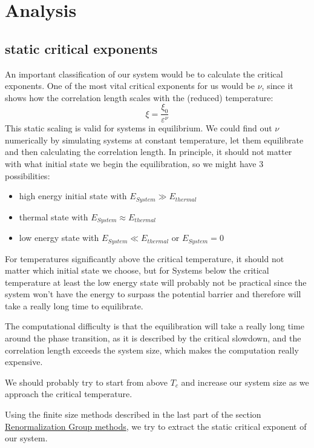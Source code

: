 	\section{Analysis}
	\subsection{static critical exponents}
	An important classification of our system would be to calculate the critical exponents. One of the most vital critical exponents for us would be $\nu$, since it shows how the correlation length scales with the (reduced) temperature:
	\begin{equation}
		\xi =	\frac{\xi_0}{\varepsilon^\nu}
	\end{equation}
	This static scaling is valid for systems in equilibrium. We could find out $\nu$ numerically by simulating systems at constant temperature, let them equilibrate and then calculating the correlation length. In principle, it should not matter with what initial state we begin the equilibration, so we might have 3 possibilities:
	\begin{itemize}
		\item high energy initial state with $E_{System} \gg E_{thermal}$
		\item thermal state with $E_{System} \approx E_{thermal}$
		\item low energy state with $E_{System} \ll E_{thermal}$ or $E_{System} =0$
	\end{itemize}
	For temperatures significantly above the critical temperature, it should not matter which initial state we choose, but for Systems below the critical temperature at least the low energy state will probably not be practical since the system won't have the energy to surpass the potential barrier and therefore will take a really long time to equilibrate.
	
	The computational difficulty is that the equilibration will take a really long time around the phase transition, as it is described by the critical slowdown, and the correlation length exceeds the system size, which makes the computation really expensive.
	
	We should probably try to start from above $T_c$ and increase our system size as we approach the critical temperature.
	
	Using the finite size methods described in the last part of the section \hyperref[withoutsecRG]{Renormalization Group methods}, we try to extract the static critical exponent of our system.
	

